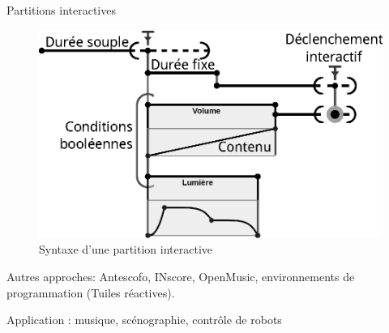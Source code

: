 \begin{block}{Partitions interactives}
\begin{figure}
\includegraphics[width=\columnwidth]{images/score.eps}
\caption{Syntaxe d'une partition interactive}
\end{figure}
Autres approches:  Antescofo, INscore, OpenMusic, environnements de programmation (Tuiles réactives).

Application : musique, scénographie, contrôle de robots
\end{block}